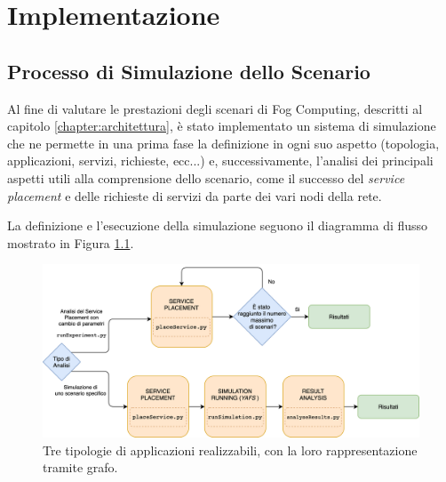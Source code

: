 \chapter{Implementazione}
\label{chapter:implementazione}

\section{Processo di Simulazione dello Scenario}

Al fine di valutare le prestazioni degli scenari di Fog Computing, descritti al capitolo \ref{chapter:architettura}, è stato implementato un sistema di simulazione che ne permette in una prima fase la definizione in ogni suo aspetto (topologia, applicazioni, servizi, richieste, ecc...) e, successivamente, l'analisi dei principali aspetti utili alla comprensione dello scenario, come il successo del \textit{service placement} e delle richieste di servizi da parte dei vari nodi della rete.

La definizione e l'esecuzione della simulazione seguono il diagramma di flusso mostrato in Figura \ref{fig:sim_flow_diagram}.

\begin{figure}[!ht]
  \includegraphics[width=14cm]{images/sim_flow_diagram}
  \centering
  \caption{Tre tipologie di applicazioni realizzabili, con la loro rappresentazione tramite grafo.}
  \label{fig:sim_flow_diagram}
\end{figure}